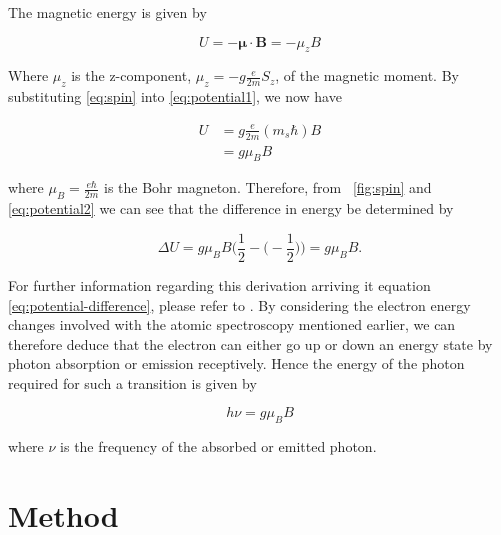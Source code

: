 \documentclass{article}
\newcommand{\figref}[2][\figurename~]{#1\ref{#2}}
\begin{document}
\vspace{2mm}
\noindent
The magnetic energy is given by \cite{Paper02}

\begin{equation}
\label{eq:potential1}
U = -\boldsymbol{\mu} \cdot \textbf{B} = - \mu_zB
\end{equation}

\vspace{2mm}
\noindent
Where $\mu_z$ is the z-component, $\mu_z = -g\frac{e}{2m}S_z$, of the magnetic moment. By substituting \eqref{eq:spin} into \eqref{eq:potential1}, we now have

\begin{equation}
\label{eq:potential2}
\begin{split}
U & = g\frac{e}{2m}(m_s\hbar)B \\
  & = g\mu_BB
\end{split}
\end{equation}

\vspace{2mm}
\noindent
where $\mu_B = \frac{e\hbar}{2m}$ is the Bohr magneton. Therefore, from \figref{fig:spin} and \eqref{eq:potential2} we can see that the difference in energy be determined by \cite{Paper02}

\begin{equation}
\label{eq:potential-difference}
\Delta U = g\mu_BB\Big(\frac{1}{2} - \Big(-\frac{1}{2}\Big)\Big) = g\mu_BB.
\end{equation}

\vspace{2mm}
\noindent
For further information regarding this derivation arriving it equation \eqref{eq:potential-difference}, please refer to \cite{Book01}. By considering the electron energy changes involved with the atomic spectroscopy mentioned earlier, we can therefore deduce that the electron can either go up or down an energy state by photon absorption or emission receptively. Hence the energy of the photon required for such a transition is given by

\begin{equation}
\label{eq:frequency-equation}
h\nu = g\mu_BB
\end{equation}

\vspace{2mm}
\noindent
where $\nu$ is the frequency of the absorbed or emitted photon. 

 
\section{Method}
\label{sec:method}
\end{document}
